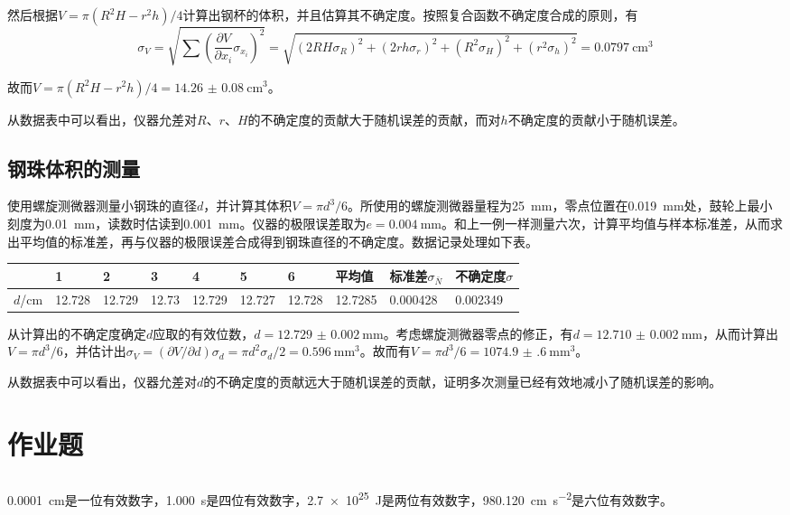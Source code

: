 \documentclass[UTF8]{ctexart}
\begin{document}
然后根据$V=\pi(R^2H-r^2h)/4$计算出钢杯的体积，并且估算其不确定度。按照复合函数不确定度合成的原则，有
\begin{equation*}
  \sigma_V=\sqrt{\sum(\frac{\partial V}{\partial x_i}\sigma_{x_i})^2}=\sqrt{(2RH\sigma_R)^2+(2rh\sigma_r)^2+(R^2\sigma_H)^2+(r^2\sigma_h)^2}=\SI{0.0797}{\cm^3}
\end{equation*}

故而$V=\pi(R^2H-r^2h)/4=\SI{14.26(8)}{\cm^3}$。

从数据表中可以看出，仪器允差对$R$、$r$、$H$的不确定度的贡献大于随机误差的贡献，而对$h$不确定度的贡献小于随机误差。

\subsection{钢珠体积的测量}
使用螺旋测微器测量小钢珠的直径$d$，并计算其体积$V=\pi d^3/6$。所使用的螺旋测微器量程为\SI{25}{\mm}，零点位置在\SI{0.019}{\mm}处，鼓轮上最小刻度为\SI{0.01}{\mm}，读数时估读到\SI{0.001}{\mm}。仪器的极限误差取为$e=\SI{0.004}{\mm}$。和上一例一样测量六次，计算平均值与样本标准差，从而求出平均值的标准差，再与仪器的极限误差合成得到钢珠直径的不确定度。数据记录处理如下表。

\noindent
\begin{tabu} to \linewidth {X|X X X X X X|X X[1.8]|X[1.8]}
\hline
& 1&  2&  3&  4&  5&  6&  平均值&标准差$\sigma_{\bar{N}}$&不确定度$\sigma$ \\
\hline
$d$/cm &12.728&12.729&12.73&12.729&12.727&12.728&12.7285&0.000428&0.002349\\
\hline
\end{tabu}

从计算出的不确定度确定$d$应取的有效位数，$d=\SI{12.729(2)}{\mm}$。考虑螺旋测微器零点的修正，有$d=\SI{12.710(2)}{\mm}$，从而计算出$V=\pi d^3/6$，并估计出$\sigma_V=(\partial V/\partial d)\sigma_d=\pi d^2 \sigma_d/2=\SI{0.596}{\mm^3}$。故而有$V=\pi d^3/6=\SI{1074.9(6)}{\mm^3}$。

从数据表中可以看出，仪器允差对$d$的不确定度的贡献远大于随机误差的贡献，证明多次测量已经有效地减小了随机误差的影响。

\section{作业题}
\subsection{}
\SI{0.0001}{cm}是一位有效数字，\SI{1.000}{s}是四位有效数字，\SI{2.7e25}{\joule}是两位有效数字，\SI{980.120}{cm.s^{-2}}是六位有效数字。
\end{document}
